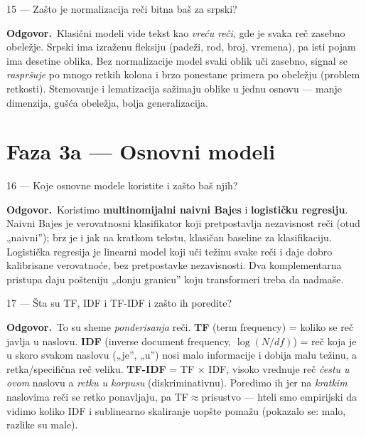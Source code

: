 \documentclass[11pt,a4paper]{article}
\newcommand{\odg}{\smallskip\noindent\textbf{Odgovor.}\ }
\begin{document}
\begin{pitanje}{15 --- Zašto je normalizacija reči bitna baš za srpski?}
\end{pitanje}
\odg Klasični modeli vide tekst kao \emph{vreću reči}, gde je svaka reč zasebno
obeležje. Srpski ima izraženu fleksiju (padeži, rod, broj, vremena), pa isti pojam ima
desetine oblika. Bez normalizacije model svaki oblik uči zasebno, signal se
\emph{raspršuje} po mnogo retkih kolona i brzo ponestane primera po obeležju
(problem retkosti). Stemovanje i lematizacija sažimaju oblike u jednu osnovu --- manje
dimenzija, gušća obeležja, bolja generalizacija.

\section{Faza 3a --- Osnovni modeli}

\begin{pitanje}{16 --- Koje osnovne modele koristite i zašto baš njih?}
\end{pitanje}
\odg Koristimo \textbf{multinomijalni naivni Bajes} i \textbf{logističku regresiju}.
Naivni Bajes je verovatnosni klasifikator koji pretpostavlja nezavisnost reči
(otud „naivni''); brz je i jak na kratkom tekstu, klasičan baseline za klasifikaciju.
Logistička regresija je linearni model koji uči težinu svake reči i daje dobro
kalibrisane verovatnoće, bez pretpostavke nezavisnosti. Dva komplementarna pristupa
daju pošteniju „donju granicu'' koju transformeri treba da nadmaše.

\begin{pitanje}{17 --- Šta su TF, IDF i TF-IDF i zašto ih poredite?}
\end{pitanje}
\odg To su sheme \emph{ponderisanja} reči. \textbf{TF} (term frequency) = koliko se reč
javlja u naslovu. \textbf{IDF} (inverse document frequency, $\log(N/df)$) = reč koja je
u skoro svakom naslovu („je'', „u'') nosi malo informacije i dobija malu težinu, a
retka/specifična reč veliku. \textbf{TF-IDF} = TF $\times$ IDF, visoko vrednuje reč
\emph{čestu u ovom} naslovu a \emph{retku u korpusu} (diskriminativnu). Poredimo ih jer
na \emph{kratkim} naslovima reči se retko ponavljaju, pa TF$\approx$prisustvo --- hteli
smo empirijski da vidimo koliko IDF i sublinearno skaliranje uopšte pomažu (pokazalo se:
malo, razlike su male).
\end{document}
